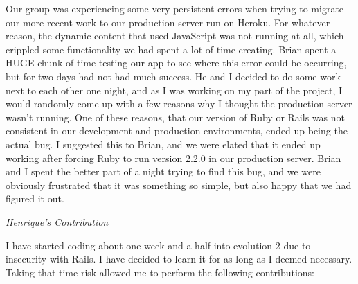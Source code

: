 \documentclass[11pt]{article}
\begin{document}
Our group was experiencing some very persistent errors when trying to migrate our more recent work to our production server run on Heroku.  For whatever reason, the dynamic content that used JavaScript was not running at all, which crippled some functionality we had spent a lot of time creating.  Brian spent a HUGE chunk of time testing our app to see where this error could be occurring, but for two days had not had much success.  He and I decided to do some work next to each other one night, and as I was working on my part of the project, I would randomly come up with a few reasons why I thought the production server wasn’t running.  One of these reasons, that our version of Ruby or Rails was not consistent in our development and production environments, ended up being the actual bug.  I suggested this to Brian, and we were elated that it ended up working after forcing Ruby to run version 2.2.0 in our production server.  Brian and I spent the better part of a night trying to find this bug, and we were obviously frustrated that it was something so simple, but also happy that we had figured it out.

\textit{Henrique's Contribution}

I have started coding about one week and a half into evolution 2 due to insecurity with Rails. I have decided to learn it for as long as I deemed necessary. Taking that time risk allowed me to perform the following contributions:
\end{document}
